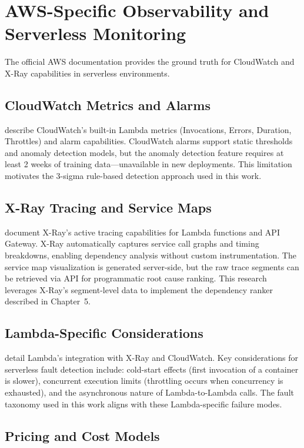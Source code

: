 \section{AWS-Specific Observability and Serverless Monitoring}

The official AWS documentation provides the ground truth for CloudWatch and X-Ray capabilities in serverless environments.

\subsection{CloudWatch Metrics and Alarms}

\citet{awscloudwatch} describe CloudWatch's built-in Lambda metrics (Invocations, Errors, Duration, Throttles) and alarm capabilities. CloudWatch alarms support static thresholds and anomaly detection models, but the anomaly detection feature requires at least 2 weeks of training data—unavailable in new deployments. This limitation motivates the 3-sigma rule-based detection approach used in this work.

\subsection{X-Ray Tracing and Service Maps}

\citet{awsxray} document X-Ray's active tracing capabilities for Lambda functions and API Gateway. X-Ray automatically captures service call graphs and timing breakdowns, enabling dependency analysis without custom instrumentation. The service map visualization is generated server-side, but the raw trace segments can be retrieved via API for programmatic root cause ranking. This research leverages X-Ray's segment-level data to implement the dependency ranker described in Chapter~5.

\subsection{Lambda-Specific Considerations}

\citet{awslambda} detail Lambda's integration with X-Ray and CloudWatch. Key considerations for serverless fault detection include: cold-start effects (first invocation of a container is slower), concurrent execution limits (throttling occurs when concurrency is exhausted), and the asynchronous nature of Lambda-to-Lambda calls. The fault taxonomy used in this work aligns with these Lambda-specific failure modes.

\subsection{Pricing and Cost Models}

